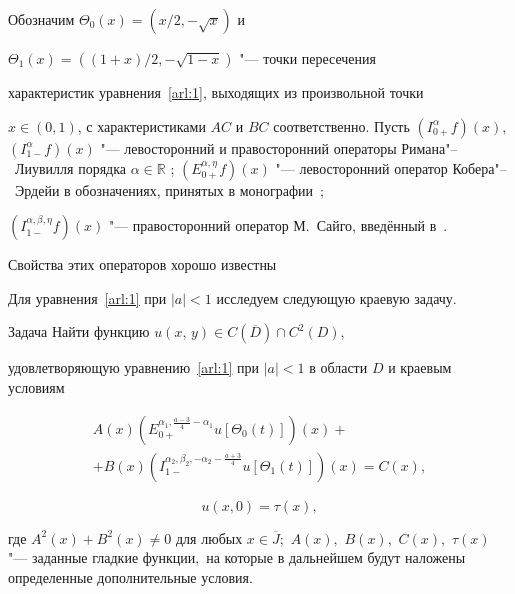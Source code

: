 Обозначим $\Theta_0(x)=\left({x}/{2}, -\sqrt{x}\right)$ и

$\Theta_1(x)=\left(({1+x})/{2}, -\sqrt{1-x}\right)$ "--- точки пересечения

характеристик уравнения~\eqref{arl:1}, выходящих из произвольной точки

\mbox{$x\in (0, 1)$}, с характеристиками $AC$ и $BC$ соответственно. Пусть $\left(I^{\alpha}_{0+}f\right)(x)$, $\left(I^{\alpha}_{1-}f\right)(x)$ "--- левосторонний и правосторонний операторы Римана"--~Лиувилля порядка $\alpha\in\mathbb{R}$ \cite{arl:bib:10}; $(E^{\alpha, \eta}_{0+}f)(x)$ "--- левосторонний оператор Кобера"--~Эрдейи в обозначениях, принятых в монографии~\cite{arl:bib:12}; 

$(I^{\alpha, \beta, \eta}_{1-}f)(x)$ "--- правосторонний оператор М.~Сайго, введённый в~\cite{arl:bib:11}. 

Свойства этих операторов хорошо известны \cite{arl:bib:10, arl:bib:12}



Для уравнения~\eqref{arl:1} при $|a|<1$ исследуем следующую краевую задачу.



\smallskip



\begin{newthm}{Задача} Найти функцию $u(x,\,y)\in C(\overline{D})\cap C^2(D),$

удовлетворяющую уравнению~\eqref{arl:1} при $|a|<1$ в области $D$ и краевым условиям

\begin{multline}

A(x)\left(E^{\alpha_1, \frac{a-3}{4}-\alpha_1}_{0+}u[\Theta_0(t)]\right)(x)+

\\

+B(x)\left(I^{\alpha_2, \beta_2, -\alpha_2-\frac{a+3}{4}}_{1-}u[\Theta_1(t)]\right)(x)=C(x),

\label{arl:2}

\end{multline}

\begin{equation}

u(x, 0)=\tau(x),

\label{arl:3}

\end{equation}

где $A^2(x)+B^2(x)\neq 0$ для любых $x\in\overline{J};$ $A(x),$ $B(x),$ $C(x),$ $\tau(x)$ "--- заданные гладкие функции$,$ на которые в дальнейшем будут наложены определенные дополнительные условия$.$

\end{newthm}



